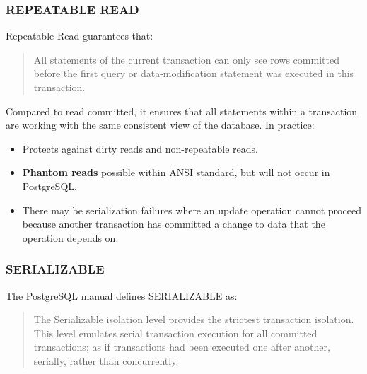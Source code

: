 \documentclass[slides]{pgnotes}
\begin{document}
\subsubsection{REPEATABLE READ}

Repeatable Read guarantees that:
\begin{quotation}
  All statements of the current transaction can only see rows committed before the first query or data-modification statement was executed in this transaction.
\end{quotation}
Compared to read committed, it ensures that all statements within a transaction are working with the same consistent view of the database.
In practice:
\begin{itemize}
\item Protects against dirty reads and non-repeatable reads.
\item \textbf{Phantom reads} possible within ANSI standard, but will not occur in PostgreSQL.
\item There may be serialization failures where an update operation cannot proceed because another transaction has committed a change to data that the operation depends on.
\end{itemize}

\subsubsection{SERIALIZABLE}

The PostgreSQL manual defines SERIALIZABLE as:
\begin{quotation}
  The Serializable isolation level provides the strictest transaction isolation. This level emulates serial transaction execution for all committed transactions; as if transactions had been executed one after another, serially, rather than concurrently.
\end{quotation}



\end{document}
